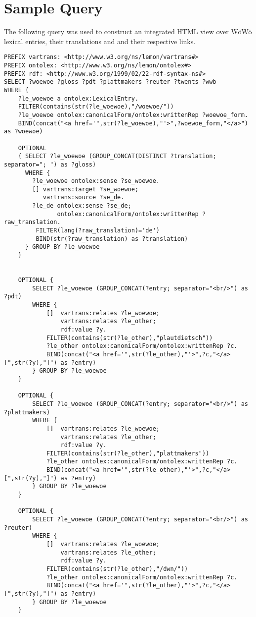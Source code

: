 \section{Sample Query}
\label{appendix-sparql}

The following query was used to construct an integrated HTML view over WöWö lexical entries, their translations and and their respective links.

{\small 
\begin{verbatim}
PREFIX vartrans: <http://www.w3.org/ns/lemon/vartrans#>
PREFIX ontolex: <http://www.w3.org/ns/lemon/ontolex#>
PREFIX rdf: <http://www.w3.org/1999/02/22-rdf-syntax-ns#>
SELECT ?woewoe ?gloss ?pdt ?plattmakers ?reuter ?twents ?wwb
WHERE {
	?le_woewoe a ontolex:LexicalEntry.
	FILTER(contains(str(?le_woewoe),"/woewoe/"))
	?le_woewoe ontolex:canonicalForm/ontolex:writtenRep ?woewoe_form.
	BIND(concat("<a href='",str(?le_woewoe),"'>",?woewoe_form,"</a>") as ?woewoe)
	
	OPTIONAL
	{ SELECT ?le_woewoe (GROUP_CONCAT(DISTINCT ?translation; separator="; ") as ?gloss)
	  WHERE {
	    ?le_woewoe ontolex:sense ?se_woewoe.
	  	[] vartrans:target ?se_woewoe;
	  	   vartrans:source ?se_de.
	  	?le_de ontolex:sense ?se_de;
	  	       ontolex:canonicalForm/ontolex:writtenRep ?raw_translation.
	  	 FILTER(lang(?raw_translation)='de')
	  	 BIND(str(?raw_translation) as ?translation)
	  } GROUP BY ?le_woewoe
	}


	OPTIONAL { 
		SELECT ?le_woewoe (GROUP_CONCAT(?entry; separator="<br/>") as ?pdt)
		WHERE {
			[] 	vartrans:relates ?le_woewoe;
				vartrans:relates ?le_other;
				rdf:value ?y.
			FILTER(contains(str(?le_other),"plautdietsch"))
			?le_other ontolex:canonicalForm/ontolex:writtenRep ?c.
            BIND(concat("<a href='",str(?le_other),"'>",?c,"</a> [",str(?y),"]") as ?entry)
		} GROUP BY ?le_woewoe 
	}

	OPTIONAL { 
		SELECT ?le_woewoe (GROUP_CONCAT(?entry; separator="<br/>") as ?plattmakers)
		WHERE {
			[] 	vartrans:relates ?le_woewoe;
				vartrans:relates ?le_other;
				rdf:value ?y.
			FILTER(contains(str(?le_other),"plattmakers"))
			?le_other ontolex:canonicalForm/ontolex:writtenRep ?c.
            BIND(concat("<a href='",str(?le_other),"'>",?c,"</a> [",str(?y),"]") as ?entry)
		} GROUP BY ?le_woewoe 
	}

	OPTIONAL { 
		SELECT ?le_woewoe (GROUP_CONCAT(?entry; separator="<br/>") as ?reuter)
		WHERE {
			[] 	vartrans:relates ?le_woewoe;
				vartrans:relates ?le_other;
				rdf:value ?y.
			FILTER(contains(str(?le_other),"/dwn/"))
			?le_other ontolex:canonicalForm/ontolex:writtenRep ?c.
            BIND(concat("<a href='",str(?le_other),"'>",?c,"</a> [",str(?y),"]") as ?entry)
		} GROUP BY ?le_woewoe 
	}


\end{verbatim}}
